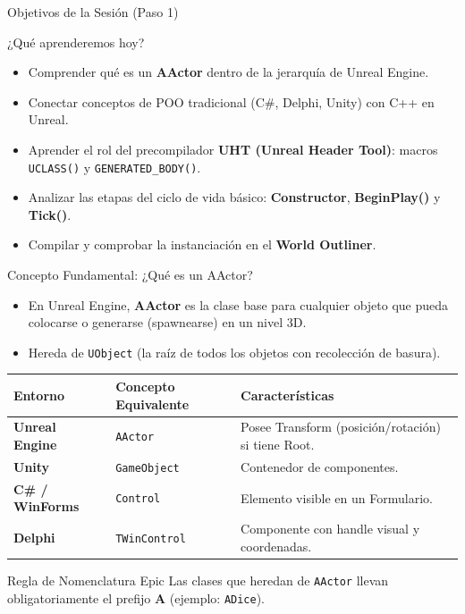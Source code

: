 \documentclass[aspectratio=169, 10pt]{beamer}
\begin{document}
\begin{frame}{Objetivos de la Sesión (Paso 1)}
    \begin{block}{¿Qué aprenderemos hoy?}
        \begin{itemize}
            \item Comprender qué es un \textbf{AActor} dentro de la jerarquía de Unreal Engine.
            \item Conectar conceptos de POO tradicional (C\#, Delphi, Unity) con C++ en Unreal.
            \item Aprender el rol del precompilador \textbf{UHT (Unreal Header Tool)}: macros \texttt{UCLASS()} y \texttt{GENERATED\_BODY()}.
            \item Analizar las etapas del ciclo de vida básico: \textbf{Constructor}, \textbf{BeginPlay()} y \textbf{Tick()}.
            \item Compilar y comprobar la instanciación en el \textbf{World Outliner}.
        \end{itemize}
    \end{block}
\end{frame}

\begin{frame}{Concepto Fundamental: ¿Qué es un AActor?}
    \begin{itemize}
        \item En Unreal Engine, \textbf{AActor} es la clase base para cualquier objeto que pueda colocarse o generarse (spawnearse) en un nivel 3D.
        \item Hereda de \texttt{UObject} (la raíz de todos los objetos con recolección de basura).
    \end{itemize}

    \vspace{0.3cm}
    \begin{table}[]
        \centering
        \footnotesize
        \begin{tabular}{@{}lll@{}}
            \toprule
            \textbf{Entorno} & \textbf{Concepto Equivalente} & \textbf{Características} \\ \midrule
            \textbf{Unreal Engine} & \texttt{AActor} & Posee Transform (posición/rotación) si tiene Root. \\
            \textbf{Unity} & \texttt{GameObject} & Contenedor de componentes. \\
            \textbf{C\# / WinForms} & \texttt{Control} & Elemento visible en un Formulario. \\
            \textbf{Delphi} & \texttt{TWinControl} & Componente con handle visual y coordenadas. \\ \bottomrule
        \end{tabular}
    \end{table}

    \begin{alertblock}{Regla de Nomenclatura Epic}
        Las clases que heredan de \texttt{AActor} llevan obligatoriamente el prefijo \textbf{A} (ejemplo: \texttt{ADice}).
    \end{alertblock}
\end{frame}
\end{document}
